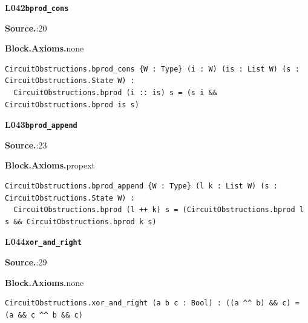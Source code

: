 \par\medskip\noindent\begin{minipage}{\textwidth}
{\small\bfseries L042\enspace\texttt{bprod\_cons}\par}
{\footnotesize\raggedright\textbf{Source.}\enspace{}:20\par
\textbf{Block.}\quad\textbf{Axioms.}\enspace none\par}\nopagebreak
\begin{lstlisting}
CircuitObstructions.bprod_cons {W : Type} (i : W) (is : List W) (s : CircuitObstructions.State W) :
  CircuitObstructions.bprod (i :: is) s = (s i && CircuitObstructions.bprod is s)
\end{lstlisting}
\end{minipage}\par

\par\medskip\noindent\begin{minipage}{\textwidth}
{\small\bfseries L043\enspace\texttt{bprod\_append}\par}
{\footnotesize\raggedright\textbf{Source.}\enspace{}:23\par
\textbf{Block.}\quad\textbf{Axioms.}\enspace propext\par}\nopagebreak
\begin{lstlisting}
CircuitObstructions.bprod_append {W : Type} (l k : List W) (s : CircuitObstructions.State W) :
  CircuitObstructions.bprod (l ++ k) s = (CircuitObstructions.bprod l s && CircuitObstructions.bprod k s)
\end{lstlisting}
\end{minipage}\par

\par\medskip\noindent\begin{minipage}{\textwidth}
{\small\bfseries L044\enspace\texttt{xor\_and\_right}\par}
{\footnotesize\raggedright\textbf{Source.}\enspace{}:29\par
\textbf{Block.}\quad\textbf{Axioms.}\enspace none\par}\nopagebreak
\begin{lstlisting}
CircuitObstructions.xor_and_right (a b c : Bool) : ((a ^^ b) && c) = (a && c ^^ b && c)
\end{lstlisting}
\end{minipage}\par

